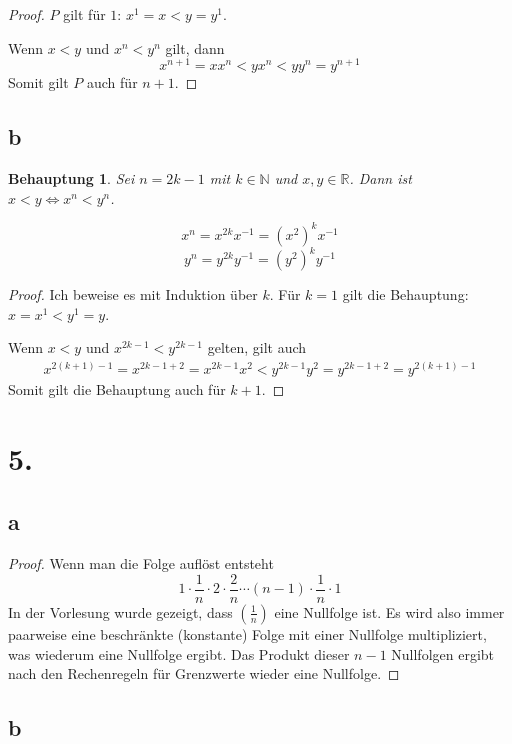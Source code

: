 \documentclass[a4paper,10pt]{article}
\newtheorem*{claim}{Behauptung}
\begin{document}
\begin{proof}
 $P$ gilt für $1$: $x^1 = x < y = y^1$.
 
 Wenn $x < y$ und $x^n < y^n$ gilt, dann
 \begin{equation*}
  x^{n + 1} = xx^n < yx^n < yy^n = y^{n + 1}
 \end{equation*}
 Somit gilt $P$ auch für $n + 1$.
\end{proof}

\subsection*{b}

\begin{claim}
 Sei $n = 2k - 1$ mit $k \in \mathbb{N}$ und $x, y \in \mathbb{R}$.
 Dann ist $x < y \Leftrightarrow x^n < y^n$.
\end{claim}

\begin{equation*}
 x^n = x^{2k}x^{-1} = (x^2)^kx^{-1}
\end{equation*}
\begin{equation*}
 y^n = y^{2k}y^{-1} = (y^2)^ky^{-1}
\end{equation*}

\begin{proof}
 Ich beweise es mit Induktion über $k$.
 Für $k = 1$ gilt die Behauptung: $x = x^1 < y^1 = y$.
 
 Wenn $x < y$ und $x^{2k - 1} < y^{2k - 1}$ gelten, gilt auch
 \begin{align*}
  x^{2(k + 1) - 1} = x^{2k - 1 + 2} = x^{2k - 1}x^2 < y^{2k - 1}y^2 = y^{2k - 1 + 2} = y^{2(k + 1) - 1}
 \end{align*}
 Somit gilt die Behauptung auch für $k + 1$.
\end{proof}

\section*{5.}

\subsection*{a}

\begin{proof}
 Wenn man die Folge auflöst entsteht
 \begin{equation*}
  1 \cdot \frac{1}{n} \cdot 2 \cdot \frac{2}{n} \cdots (n - 1) \cdot \frac{1}{n} \cdot 1
 \end{equation*}
 In der Vorlesung wurde gezeigt, dass $(\frac{1}{n})$ eine Nullfolge ist.
 Es wird also immer paarweise eine beschränkte (konstante) Folge mit einer Nullfolge multipliziert, was wiederum eine Nullfolge ergibt.
 Das Produkt dieser $n - 1$ Nullfolgen ergibt nach den Rechenregeln für Grenzwerte wieder eine Nullfolge.
\end{proof}

\subsection*{b}
\end{document}
